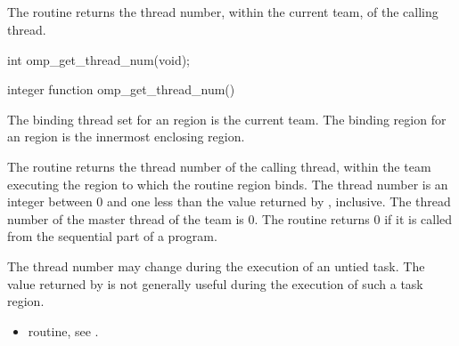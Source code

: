 \newpage %

\subsection{}
\label{subsec:omp_get_thread_num}
\summary
The  routine returns the thread number, within the current 
team, of the calling thread.

\format
\begin{ccppspecific}
\begin{ompcFunction}
int omp_get_thread_num(void);
\end{ompcFunction}
\end{ccppspecific}

\begin{fortranspecific}
\begin{ompfFunction}
integer function omp_get_thread_num()
\end{ompfFunction}
\end{fortranspecific}

\binding
The binding thread set for an  region is the current team. The 
binding region for an  region is the innermost enclosing 
 region. 

\effect
The  routine returns the thread number of the calling thread, 
within the team executing the  region to which the routine region binds. The 
thread number is an integer between 0 and one less than the value returned by 
, inclusive. The thread number of the master thread of the 
team is 0. The routine returns 0 if it is called from the sequential part of a program.

\begin{note}
The thread number may change during the execution of an untied task. The 
value returned by  is not generally useful during the execution 
of such a task region.
\end{note}

\crossreferences
\begin{itemize}
\item {} routine, see 
.
\end{itemize}








